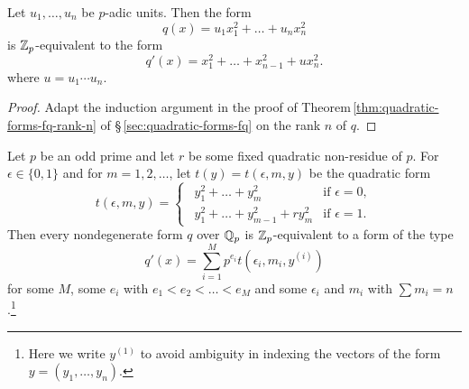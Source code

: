 \begin{lemmax}
    Let \(u_1, \dots, u_n\) be \(p\)-adic units. Then the form
    \[
        q(x) = u_1 x_1^2 + \dots + u_n x_n^2
    \]
    is \(\mathbb{Z}_p\)-equivalent to the form
    \[
        q'(x) = x_1^2 + \dots + x_{n-1}^2 + ux_n^2.
    \]
    where \(u = u_1 \cdots u_{n}\).
\end{lemmax}

\begin{proof}
    Adapt the induction argument in the proof of
    Theorem\,\ref{thm:quadratic-forms-fq-rank-n} of
    \S\,\ref{sec:quadratic-forms-fq} on the rank \(n\) of \(q\).
\end{proof}

\begin{theoremx}
    {\normalfont\cite[p.\,115--116]{cassels2008rational}} Let \(p\) be an odd
    prime and let \(r\) be some fixed quadratic non-residue of \(p\). For
    \(\epsilon \in \{0, 1\}\) and for \(m = 1, 2, \dots\), let \(t(y) =
    t(\epsilon, m, y)\) be the quadratic form
    \[
        t(\epsilon, m, y) = \begin{cases}
            \ \ y_1^2 + \dots + y_m^2 & \text{if } \epsilon = 0,\\
            \ \ y_1^2 + \dots + y_{m-1}^2 + r y_m^2 & \text{if } \epsilon = 1.
        \end{cases}
    \]
    Then every nondegenerate form \(q\) over \(\mathbb{Q}_p\) is
    \(\mathbb{Z}_p\)-equivalent to a form of the type
    \begin{equation}\label{eq:canonical-forms}
        q'(x) = \sum_{i=1}^M p^{e_i} t(\epsilon_i, m_i, y^{(i)})
    \end{equation}
    for some \(M\), some \(e_i\) with \(e_1 < e_2 < \dots < e_M\) and some
    \(\epsilon_i\) and \(m_i\) with \(\sum m_i = n\).\footnote{Here we write
    \(y^{(1)}\) to avoid ambiguity in indexing the vectors of the form \(y =
    (y_1, \dots, y_n)\).}
\end{theoremx}

